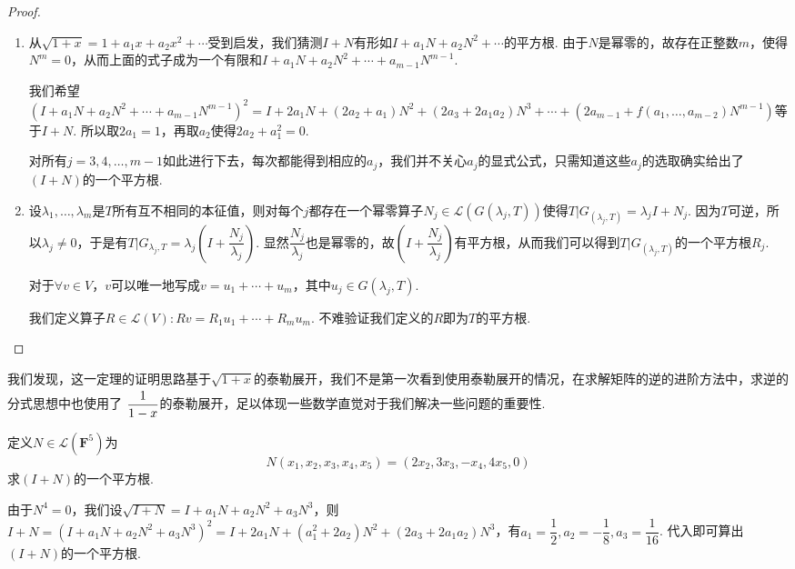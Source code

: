 \begin{proof}
    \begin{enumerate}
        \item 从$\sqrt{1+x}=1+a_1x+a_2x^2+\cdots$受到启发，我们猜测$I+N$有形如$I+a_1N+a_2N^2+\cdots$的平方根.
        由于$N$是幂零的，故存在正整数$m$，使得$N^m=0$，从而上面的式子成为一个有限和$I+a_1N+a_2N^2+\cdots+a_{m-1}N^{m-1}$.

        我们希望$(I+a_1N+a_2N^2+\cdots+a_{m-1}N^{m-1})^2=I+2a_1N+(2a_2+a_1)N^2+(2a_3+2a_1a_2)N^3+\cdots+(2a_{m-1}+f(a_1,\ldots,a_{m-2})N^{m-1})$等于$I+N$. 所以取$2a_1=1$，再取$a_2$使得$2a_2+a_1^2=0$.

        对所有$j=3,4,\ldots,m-1$如此进行下去，每次都能得到相应的$a_j$，我们并不关心$a_j$的显式公式，只需知道这些$a_j$的选取确实给出了$(I+N)$的一个平方根.
        \item 设$\lambda_1,\ldots,\lambda_m$是$T$所有互不相同的本征值，则对每个$j$都存在一个幂零算子$N_j\in \mathcal{L}(G(\lambda_j,T))$使得$T|G_{(\lambda_j,T)}=\lambda_jI+N_j$. 因为$T$可逆，所以$\lambda_j \neq 0$，于是有$T|G_{\lambda_j,T}=\lambda_j(I+\dfrac{N_j}{\lambda_j})$.
        显然$\dfrac{N_j}{\lambda_j}$也是幂零的，故$(I+\dfrac{N_j}{\lambda_j})$有平方根，从而我们可以得到$T|G_{(\lambda_j,T)}$的一个平方根$R_j$.

        对于$\forall v\in V$，$v$可以唯一地写成$v=u_1+\cdots+u_m$，其中$u_j\in G(\lambda_j,T)$.

        我们定义算子$R\in\mathcal{L}(V):Rv=R_1u_1+\cdots+R_mu_m$. 不难验证我们定义的$R$即为$T$的平方根.
    \end{enumerate}
\end{proof}

我们发现，这一定理的证明思路基于$\sqrt{1+x}$的泰勒展开，我们不是第一次看到使用泰勒展开的情况，在求解矩阵的逆的进阶方法中，求逆的分式思想中也使用了 $\vphantom{\cfrac{1}{1-x}}\dfrac{1}{1-x}$的泰勒展开，足以体现一些数学直觉对于我们解决一些问题的重要性.

\begin{example}{}{}
    定义$N\in \mathcal{L}(\mathbf{F}^5)$为
    \[N(x_1,x_2,x_3,x_4,x_5)=(2x_2,3x_3,-x_4,4x_5,0)\]
    求$(I+N)$的一个平方根.
\end{example}

\begin{solution}
    由于$N^4=0$，我们设$\sqrt{I+N}=I+a_1N+a_2N^2+a_3N^3$，则$I+N=(I+a_1N+a_2N^2+a_3N^3)^2=I+2a_1N+(a_1^2+2a_2)N^2+(2a_3+2a_1a_2)N^3$，有$a_1=\dfrac{1}{2},a_2=-\dfrac{1}{8},a_3=\dfrac{1}{16}$. 代入即可算出$(I+N)$的一个平方根.
\end{solution}

